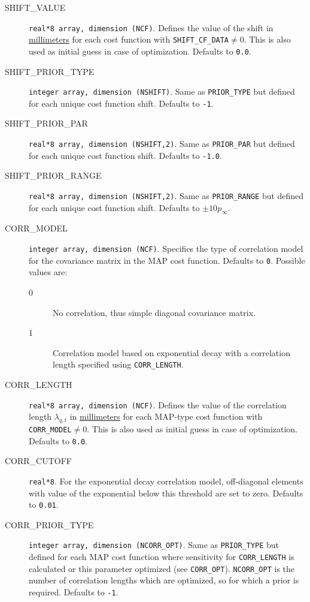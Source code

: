 \begin{description}
  \item[SHIFT\_VALUE] {\tt real*8 array, dimension (NCF)}. Defines the value of the shift in \underline{millimeters} for each cost function with {\tt SHIFT\_CF\_DATA}$\neq0$. This is also used as initial guess in case of optimization. Defaults to {\tt 0.0}.
  \item[SHIFT\_PRIOR\_TYPE] {\tt integer array, dimension (NSHIFT)}. Same as {\tt PRIOR\_TYPE} but defined for each unique cost function shift. Defaults to {\tt -1}.
  \item[SHIFT\_PRIOR\_PAR] {\tt real*8 array, dimension (NSHIFT,2)}. Same as {\tt PRIOR\_PAR} but defined for each unique cost function shift. Defaults to {\tt -1.0}.
  \item[SHIFT\_PRIOR\_RANGE] {\tt real*8 array, dimension (NSHIFT,2)}. Same as {\tt PRIOR\_RANGE} but defined for each unique cost function shift. Defaults to {\tt $\pm 10p_{\infty}$}.
  \item[CORR\_MODEL] {\tt integer array, dimension (NCF)}. Specifies the type of correlation model for the covariance matrix in the MAP cost function. Defaults to {\tt 0}. Possible values are:
  \begin{description}
  	\item[0] No correlation, thus simple diagonal covariance matrix.
  	\item[1] Correlation model based on exponential decay with a correlation length specified using {\tt CORR\_LENGTH}.
  \end{description}
  \item[CORR\_LENGTH] {\tt real*8 array, dimension (NCF)}. Defines the value of the correlation length $\lambda_{q,t}$ in \underline{millimeters} for each MAP-type cost function with {\tt CORR\_MODEL}$\neq0$. This is also used as initial guess in case of optimization. Defaults to {\tt 0.0}.
  \item[CORR\_CUTOFF] {\tt real*8}. For the exponential decay correlation model, off-diagonal elements with value of the exponential below this threshold are set to zero. Defaults to {\tt 0.01}.
  \item[CORR\_PRIOR\_TYPE] {\tt integer array, dimension (NCORR\_OPT)}. Same as {\tt PRIOR\_TYPE} but defined for each MAP cost function where sensitivity for {\tt CORR\_LENGTH} is calculated or this parameter optimized (see {\tt CORR\_OPT}). {\tt NCORR\_OPT} is the number of correlation lengths which are optimized, so for which a prior is required. Defaults to {\tt -1}.

\end{description}
